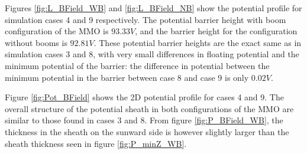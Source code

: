 Figures \ref{fig:L_BField_WB} and \ref{fig:L_BField_NB} show the potential profile for simulation cases 4 and 9 respectively. The potential barrier height with boom configuration of the MMO is $93.33 V$, and the barrier height for the configuration without booms is $92.81 V$. These potential barrier heights are the exact same as in simulation cases 3 and 8, with very small differences in floating potential and the minimum potential of the barrier: the difference in potential between the minimum potential in the barrier between case 8 and case 9 is only $0.02 V$.

Figure \ref{fig:Pot_BField} shows the 2D potential profile for cases 4 and 9. The overall structure of the potential sheath in both configurations of the MMO are similar to those found in cases 3 and 8. From figure \ref{fig:P_BField_WB}, the thickness in the sheath on the sunward side is however slightly larger than the sheath thickness seen in figure \ref{fig:P_minZ_WB}.



